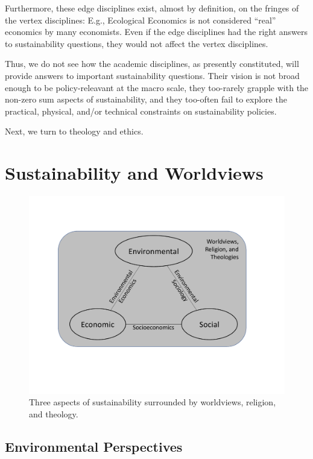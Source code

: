 \documentclass[12pt]{article}
\begin{document}
Furthermore, these edge disciplines exist, almost by definition, 
on the fringes of the vertex disciplines:
E.g., Ecological Economics is not considered ``real'' economics by many economists.
Even if the edge disciplines had the right answers to sustainability questions, 
they would not affect the vertex disciplines. 

Thus, we do not see how the academic disciplines, as presently constituted,
will provide answers to important sustainability questions.
Their vision is not broad enough to be policy-releavant at the macro scale, 
they too-rarely grapple with the non-zero sum aspects of sustainability, and
they too-often fail to explore the practical, physical, and/or technical
constraints on sustainability policies. 

Next, we turn to theology and ethics.


\section{Sustainability and Worldviews}
\label{sec:worldviews}


\begin{figure}
\centering
\includegraphics[width=0.75\linewidth]{figure_other/TriangleDiagramWithTheology.pdf}
\caption{Three aspects of sustainability surrounded by worldviews, religion, and theology.}
\label{fig:3_sustain_with_worldviews}
\end{figure}

\subsection{Environmental Perspectives}
\label{sec:environmental}
\end{document}
